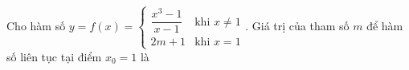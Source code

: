 \begin{ex}
Cho hàm số $y=f(x)=\begin{cases}\dfrac{x^3-1}{x-1}&\text{khi }x\ne1\\2m+1&\text{khi }x=1\end{cases}$. Giá trị của tham số $m$ để hàm số liên tục tại điểm $x_0=1$ là
\end{ex}
